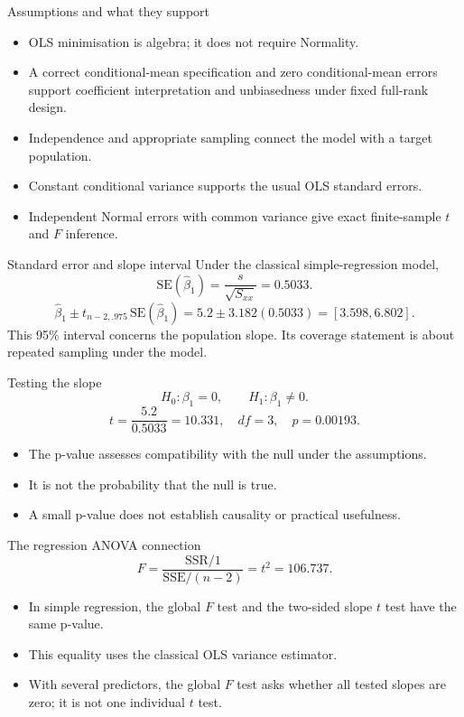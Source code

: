 \begin{frame}{Assumptions and what they support}
\begin{itemize}
\item OLS minimisation is algebra; it does not require Normality.
\item A correct conditional-mean specification and zero conditional-mean errors support coefficient interpretation and unbiasedness under fixed full-rank design.
\item Independence and appropriate sampling connect the model with a target population.
\item Constant conditional variance supports the usual OLS standard errors.
\item Independent Normal errors with common variance give exact finite-sample $t$ and $F$ inference.
\end{itemize}
\end{frame}

\begin{frame}{Standard error and slope interval}
Under the classical simple-regression model,\[\mathrm{SE}(\hat\beta_1)=\frac{s}{\sqrt{S_{xx}}}=0.5033.\]\[\hat\beta_1\pm t_{n-2,.975}\,\mathrm{SE}(\hat\beta_1)=5.2\pm3.182(0.5033)=[3.598,6.802].\]This 95\% interval concerns the population slope. Its coverage statement is about repeated sampling under the model.
\end{frame}

\begin{frame}{Testing the slope}
\[H_0:\beta_1=0,\qquad H_1:\beta_1\ne0.\]\[t=\frac{5.2}{0.5033}=10.331,\quad df=3,\quad p=0.00193.\]\begin{itemize}
\item The p-value assesses compatibility with the null under the assumptions.
\item It is not the probability that the null is true.
\item A small p-value does not establish causality or practical usefulness.
\end{itemize}
\end{frame}

\begin{frame}{The regression ANOVA connection}
\[F=\frac{\mathrm{SSR}/1}{\mathrm{SSE}/(n-2)}=t^2=106.737.\]\begin{itemize}
\item In simple regression, the global $F$ test and the two-sided slope $t$ test have the same p-value.
\item This equality uses the classical OLS variance estimator.
\item With several predictors, the global $F$ test asks whether all tested slopes are zero; it is not one individual $t$ test.
\end{itemize}
\end{frame}

